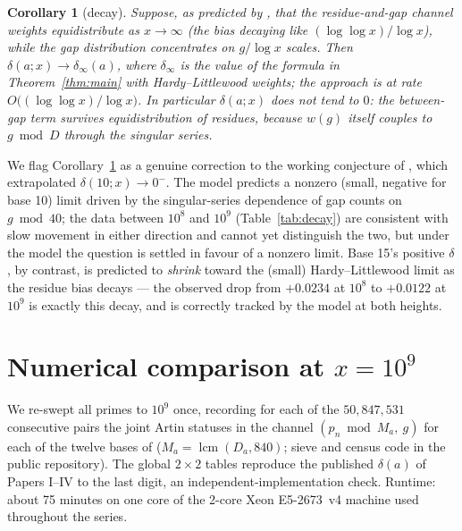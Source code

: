 \documentclass[11pt,reqno]{amsart}
\theoremstyle{plain}
\newtheorem{corollary}[theorem]{Corollary}
\theoremstyle{definition}
\begin{document}
\begin{corollary}[decay]\label{cor:decay}
Suppose, as predicted by \cite{LOS2016}, that the residue-and-gap channel
weights equidistribute as $x \to \infty$ (the bias decaying like
$(\log\log x)/\log x$), while the gap distribution concentrates on
$g / \log x$ scales. Then $\delta(a; x) \to \delta_\infty(a)$, where
$\delta_\infty$ is the value of the formula in Theorem~\ref{thm:main} with
Hardy--Littlewood weights; the approach is at rate
$O\!\bigl((\log \log x)/\log x\bigr)$. In particular $\delta(a; x)$ does not
tend to $0$: the between-gap term survives equidistribution of residues,
because $w(g)$ itself couples to $g \bmod D$ through the singular series.
\end{corollary}

We flag Corollary~\ref{cor:decay} as a genuine correction to the working
conjecture of \cite{BaldI}, which extrapolated $\delta(10; x) \to 0^-$. The
model predicts a nonzero (small, negative for base 10) limit driven by the
singular-series dependence of gap counts on $g \bmod 40$; the data between
$10^8$ and $10^9$ (Table~\ref{tab:decay}) are consistent with slow movement
in either direction and cannot yet distinguish the two, but under the model
the question is settled in favour of a nonzero limit. Base 15's positive
$\delta$, by contrast, is predicted to \emph{shrink} toward the (small)
Hardy--Littlewood limit as the residue bias decays --- the observed drop from
$+0.0234$ at $10^8$ to $+0.0122$ at $10^9$ is exactly this decay, and is
correctly tracked by the model at both heights.

\section{Numerical comparison at \texorpdfstring{$x = 10^9$}{x = 1e9}}

We re-swept all primes to $10^9$ once, recording for each of the
$50{,}847{,}531$ consecutive pairs the joint Artin statuses in the channel
$(p_n \bmod M_a,\ g)$ for each of the twelve bases of \cite{BaldII, BaldIV}
($M_a = \operatorname{lcm}(D_a, 840)$; sieve and census code in the public
repository). The global $2 \times 2$ tables reproduce the published
$\delta(a)$ of Papers I--IV to the last digit, an independent-implementation
check. Runtime: about 75 minutes on one core of the 2-core Xeon E5-2673~v4
machine used throughout the series.
\end{document}
